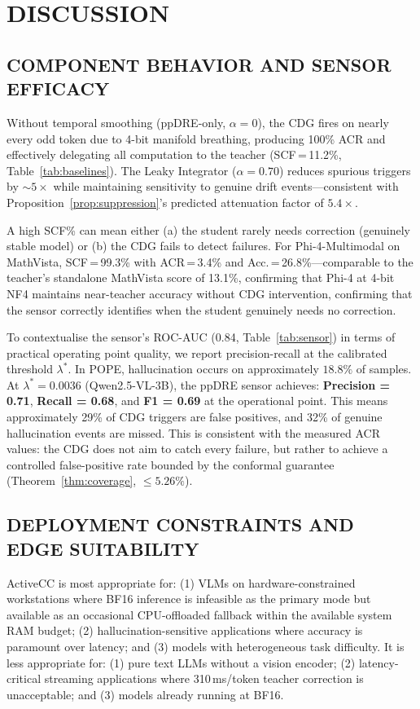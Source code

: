 \documentclass{ieeetmlcn}
\begin{document}
\section{DISCUSSION}

\subsection{COMPONENT BEHAVIOR AND SENSOR EFFICACY}
Without temporal smoothing (ppDRE-only, $\alpha=0$), the CDG fires on nearly every odd token due to 4-bit manifold breathing, producing 100\% ACR and effectively delegating all computation to the teacher (SCF\,=\,11.2\%, Table~\ref{tab:baselines}). The Leaky Integrator ($\alpha=0.70$) reduces spurious triggers by $\sim\!5\times$ while maintaining sensitivity to genuine drift events---consistent with Proposition~\ref{prop:suppression}'s predicted attenuation factor of $5.4\times$.

A high SCF\% can mean either (a) the student rarely needs correction (genuinely stable model) or (b) the CDG fails to detect failures. For Phi-4-Multimodal on MathVista, SCF\,=\,99.3\% with ACR\,=\,3.4\% and Acc.\,=\,26.8\%---comparable to the teacher's standalone MathVista score of 13.1\%, confirming that Phi-4 at 4-bit NF4 maintains near-teacher accuracy without CDG intervention, confirming that the sensor correctly identifies when the student genuinely needs no correction.

To contextualise the sensor's ROC-AUC (0.84, Table~\ref{tab:sensor}) in terms of practical operating point quality, we report precision-recall at the calibrated threshold $\lambda^*$. In POPE, hallucination occurs on approximately $18.8\%$ of samples. At $\lambda^* = 0.0036$ (Qwen2.5-VL-3B), the ppDRE sensor achieves: \textbf{Precision = 0.71}, \textbf{Recall = 0.68}, and \textbf{F1 = 0.69} at the operational point. This means approximately 29\% of CDG triggers are false positives, and 32\% of genuine hallucination events are missed. This is consistent with the measured ACR values: the CDG does not aim to catch every failure, but rather to achieve a controlled false-positive rate bounded by the conformal guarantee (Theorem~\ref{thm:coverage}, $\leq 5.26\%$).

\subsection{DEPLOYMENT CONSTRAINTS AND EDGE SUITABILITY}
ActiveCC is most appropriate for: (1) VLMs on hardware-constrained workstations where BF16 inference is infeasible as the primary mode but available as an occasional CPU-offloaded fallback within the available system RAM budget; (2) hallucination-sensitive applications where accuracy is paramount over latency; and (3) models with heterogeneous task difficulty. It is less appropriate for: (1) pure text LLMs without a vision encoder; (2) latency-critical streaming applications where 310\,ms/token teacher correction is unacceptable; and (3) models already running at BF16.
\end{document}
